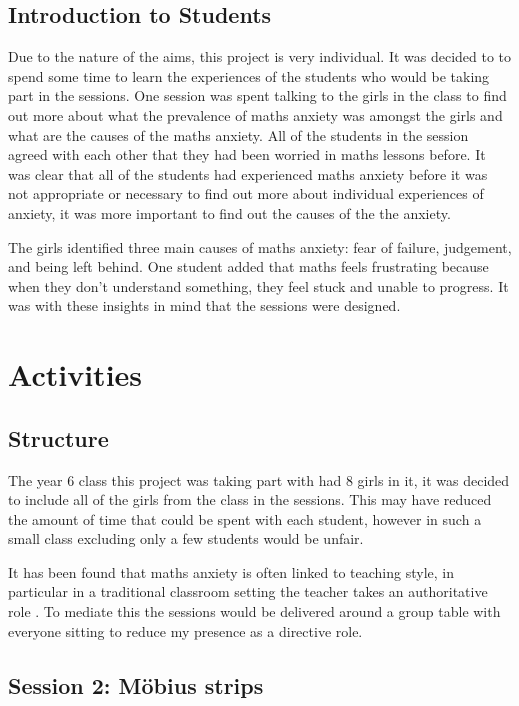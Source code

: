 \documentclass[11pt, a4paper, notitlepage]{article}
\begin{document}
\subsection{Introduction to Students}
Due to the nature of the aims, this project is very individual. It was decided to to spend some time to learn the experiences of the students who would be taking part in the sessions. One session was spent talking to the girls in the class to find out more about what the prevalence of maths anxiety was amongst the girls and what are the causes of the maths anxiety. All of the students in the session agreed with each other that they had been worried in maths lessons before. It was clear that all of the students had experienced maths anxiety before it was not appropriate or necessary to find out more about individual experiences of anxiety, it was more important to find out the causes of the the anxiety.
\par
The girls identified three main causes of maths anxiety: fear of failure, judgement, and being left behind. One student added that maths feels frustrating because when they don't understand something, they feel stuck and unable to progress. It was with these insights in mind that the sessions were designed.

\section{Activities}
\subsection{Structure}
The year 6 class this project was taking part with had 8 girls in it, it was decided to include all of the girls from the class in the sessions. This may have reduced the amount of time that could be spent with each student, however in such a small class excluding only a few students would be unfair. 
\par It has been found that maths anxiety is often linked to teaching style, in particular in a traditional classroom setting the teacher takes an authoritative role \cite{Finlayson:2014}. To mediate this the sessions would be delivered around a group table with everyone sitting to reduce my presence as a directive role. 


\subsection{Session 2: M\"obius strips}
\end{document}
